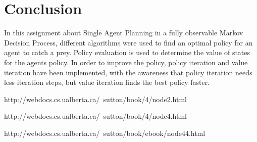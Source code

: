 \documentclass[11pt]{article}
\begin{document}
\section{Conclusion}
In this assignment about Single Agent Planning in a fully observable Markov Decision Process, different algorithms were used to find an optimal policy for an agent to catch a prey. Policy evaluation is used to determine the value of states for the agents policy. In order to improve the policy, policy iteration and value iteration have been implemented, with the awareness that policy iteration needs less iteration steps, but value iteration finds the best policy faster.


\begin{thebibliography}{3}

 http://webdocs.cs.ualberta.ca/~sutton/book/4/node2.html

 http://webdocs.cs.ualberta.ca/~sutton/book/4/node4.html

 http://webdocs.cs.ualberta.ca/~sutton/book/ebook/node44.html


\end{thebibliography}
\end{document}

